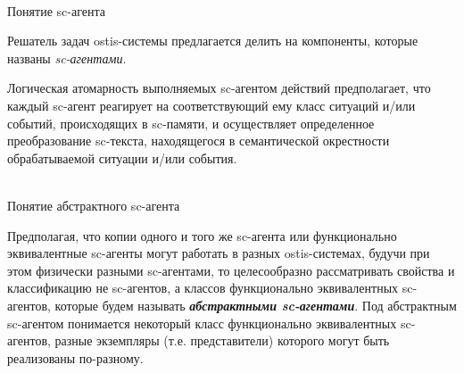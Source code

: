 \begin{frame}{\\Понятие sc-агента}
	\topline
	\justifying
	
	\vspace{10mm}
	
	Решатель задач ostis-системы предлагается делить на компоненты, которые названы \textit{sc-агентами}.
	
	\begin{SCn}
	\end{SCn}
	
	Логическая атомарность выполняемых sc-агентом действий предполагает, что каждый sc-агент реагирует на соответствующий ему класс ситуаций и/или событий, происходящих в sc-памяти, и осуществляет определенное преобразование sc-текста, находящегося в семантической окрестности обрабатываемой ситуации и/или события.

\end{frame}

\begin{frame}{\\Понятие абстрактного sc-агента}
		\topline
	\justifying
	
	Предполагая, что копии одного и того же sc-агента или функционально эквивалентные sc-агенты могут работать в разных ostis-системах, будучи при этом физически разными sc-агентами, то целесообразно рассматривать свойства и классификацию не sc-агентов, а классов функционально эквивалентных sc-агентов, которые будем называть \textbf{\textit{абстрактными sc-агентами}}. Под абстрактным sc-агентом понимается некоторый класс функционально эквивалентных sc-агентов, разные экземпляры (т.е. представители) которого могут быть реализованы по-разному.	
\end{frame}


